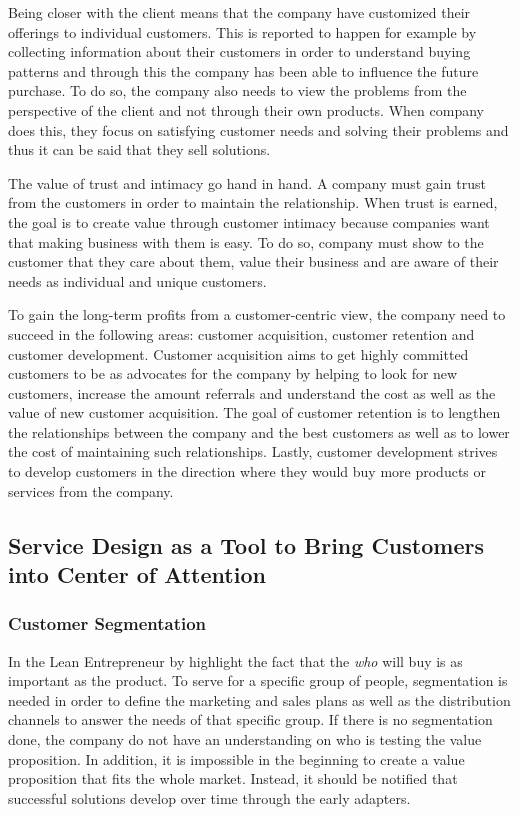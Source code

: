 Being closer with the client means that the company have customized their offerings to individual customers. This is reported to happen for example by collecting information about their customers in order to understand buying patterns and through this the company has been able to influence the future purchase. To do so, the company also needs to view the problems from the perspective of the client and not through their own products. When company does this, they focus on satisfying customer needs and solving their problems and thus it can be said that they sell solutions. \parencite{Parniangtong:2017}

The value of trust and intimacy go hand in hand. A company must gain trust from the customers in order to maintain the relationship. When trust is earned, the goal is to create value through customer intimacy because companies want that making business with them is easy. To do so, company must show to the customer that they care about them, value their business and are aware of their needs as individual and unique customers. \parencite{Parniangtong:2017}

To gain the long-term profits from a customer-centric view, the company need to succeed in the following areas: customer acquisition, customer retention and customer development. Customer acquisition aims to get highly committed customers to be as advocates for the company by helping to look for new customers, increase the amount referrals and understand the cost as well as the value of new customer acquisition. The goal of customer retention is to lengthen the relationships between the company and the best customers as well as to lower the cost of maintaining such relationships. Lastly, customer development strives to develop customers in the direction where they would buy more products or services from the company. \parencite{Fader:2012}


\subsection{Service Design as a Tool to Bring Customers into Center of Attention}

\subsubsection*{Customer Segmentation}

In the Lean Entrepreneur by \textcite{LeanEntrepreneur:2013} highlight the fact that the \emph{who} will buy is as important as the product. To serve for a specific group of people, segmentation is needed in order to define the marketing and sales plans as well as the distribution channels to answer the needs of that specific group. If there is no segmentation done, the company do not have an understanding on who is testing the value proposition. In addition, it is impossible in the beginning to create a value proposition that fits the whole market. Instead, it should be notified that successful solutions develop over time through the early adapters.

